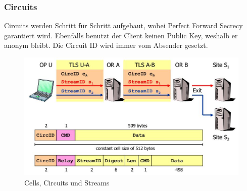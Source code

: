 \subsubsection{Circuits}
Circuits werden Schritt für Schritt aufgebaut, wobei Perfect Forward Secrecy garantiert wird. Ebenfalls benutzt der Client keinen Public Key, weshalb er anonym bleibt. Die Circuit ID wird immer vom Absender gesetzt.

\begin{figure}[h]
\centering
\includegraphics[width=0.7\linewidth]{images/tor_cells_circuits_streams}
\caption{Cells, Circuits und Streams}
\label{fig:torcellscircuitsstreams}
\end{figure}


